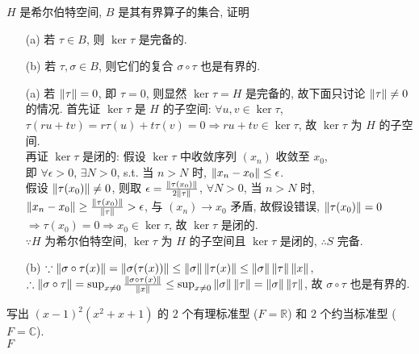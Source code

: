 \documentclass{assignment}
\begin{document}
\begin{prob}
    $H$ 是希尔伯特空间, $B$ 是其有界算子的集合, 证明
    \begin{itemize}
        \item[(a)] 若 $\tau\in B$, 则 $\ker\tau$ 是完备的.
        \item[(b)] 若 $\tau,\sigma\in B$, 则它们的复合 $\sigma\circ\tau$ 也是有界的.
    \end{itemize}
\end{prob}
\begin{pf}
    \begin{itemize}
        \item[(a)] 若 $\left\lVert\tau\right\rVert=0$, 即 $\tau=0$, 则显然 $\ker\tau=H$ 是完备的, 故下面只讨论 $\left\lVert\tau\right\rVert\neq 0$ 的情况.
        首先证 $\ker\tau$ 是 $H$ 的子空间: $\forall u,v\in\ker\tau$, $\tau(ru+tv)=r\tau(u)+t\tau(v)=0\Longrightarrow ru+tv\in\ker\tau$, 故 $\ker\tau$ 为 $H$ 的子空间.\\
        再证 $\ker\tau$ 是闭的: 假设 $\ker\tau$ 中收敛序列 $(x_n)$ 收敛至 $x_0$,\\
        即 $\forall\epsilon>0$, $\exists N>0$, s.t. 当 $n>N$ 时, $\left\lVert x_n-x_0\right\rVert\leq\epsilon$.\\
        假设 $\left\lVert\tau(x_0)\right\rVert\neq 0$, 则取 $\epsilon=\frac{\left\lVert\tau(x_0)\right\rVert}{2\left\lVert\tau\right\rVert}$, $\forall N>0$, 当 $n>N$ 时, $\left\lVert x_n-x_0\right\rVert\geq\frac{\left\lVert\tau(x_0)\right\rVert}{\left\lVert\tau\right\rVert}>\epsilon$, 与 $(x_n)\rightarrow x_0$ 矛盾, 故假设错误, $\left\lVert\tau(x_0)\right\rVert=0$\\
        $\Longrightarrow\tau(x_0)=0\Longrightarrow x_0\in\ker\tau$, 故 $\ker\tau$ 是闭的.\\
        $\because H$ 为希尔伯特空间, $\ker\tau$ 为 $H$ 的子空间且 $\ker\tau$ 是闭的, $\therefore S$ 完备.
        \item[(b)] $\because\left\lVert\sigma\circ\tau(x)\right\rVert=\left\lVert\sigma(\tau(x))\right\rVert\leq\left\lVert\sigma\right\rVert\left\lVert\tau(x)\right\rVert\leq\left\lVert\sigma\right\rVert\left\lVert\tau\right\rVert\left\lVert x\right\rVert$, $\therefore\left\lVert\sigma\circ\tau\right\rVert=\sup_{x\neq 0}\frac{\left\lVert\sigma\circ\tau(x)\right\rVert}{\left\lVert x\right\rVert}\leq\sup_{x\neq 0}\left\lVert\sigma\right\rVert\left\lVert\tau\right\rVert=\left\lVert\sigma\right\rVert\left\lVert\tau\right\rVert$, 故 $\sigma\circ\tau$ 也是有界的.
    \end{itemize}
\end{pf}

\begin{prob}
    写出 $(x-1)^2(x^2+x+1)$ 的 $2$ 个有理标准型 ($F=\mathbb{R}$) 和 $2$ 个约当标准型 ($F=\mathbb{C}$).\\
    $F$
\end{prob}
\end{document}
